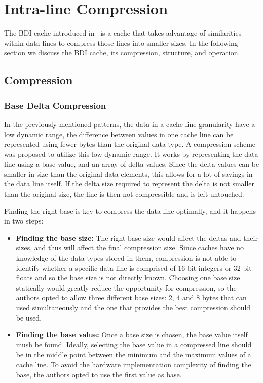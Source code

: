 
\section{Intra-line Compression}
\label{sec:BDI}
The BDI cache introduced in~\cite{bdi} is a cache that takes advantage of similarities within data lines to compress those lines into smaller sizes. In the following section we discuss the BDI cache, its compression, structure, and operation.
\subsection{Compression}
\label{Compression}
\subsubsection{Base Delta Compression}
In the previously mentioned patterns, the data in a cache line granularity have a low dynamic range, the difference between values in one cache line can be represented using fewer bytes than the original data type. A compression scheme was proposed to utilize this low dynamic range. It works by representing the data line using a base value, and an array of delta values. Since the delta values can be smaller in size than the original data elements, this allows for a lot of savings in the data line itself. If the delta size required to represent the delta is not smaller than the original size, the line is then not compressible and is left untouched.\par
Finding the right base is key to compress the data line optimally, and it happens in two steps:
\begin{itemize}
    \item \textbf{Finding the base size:} The right base size would affect the deltas and their sizes, and thus will affect the final compression size. Since caches have no knowledge of the data types stored in them, compression is not able to identify whether a specific data line is comprised of 16 bit integers or 32 bit floats and so the base size is not directly known. Choosing one base size statically would greatly reduce the opportunity for compression, so the authors opted to allow three different base sizes: 2, 4 and 8 bytes that can used simultaneously and the one that provides the best compression should be used.
    \item \textbf{Finding the base value:} Once a base size is chosen, the base value itself mush be found. Ideally, selecting the base value in a compressed line should be in the middle point between the minimum and the maximum values of a cache line. To avoid the hardware implementation complexity of finding the base, the authors opted to use the first value as base.
\end{itemize}
